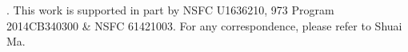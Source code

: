 .
This work is supported in part by NSFC {\small U1636210}, 973 Program {\small 2014CB340300} \& NSFC {\small 61421003}. For any correspondence, please refer to Shuai Ma.
